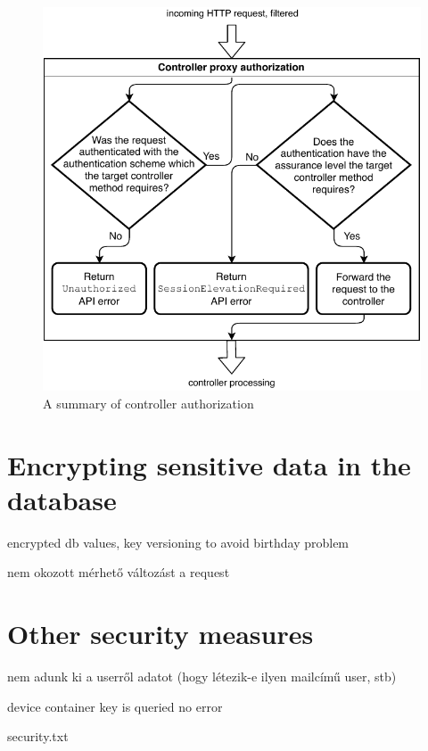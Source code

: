 \begin{figure}[!htb]
    \includegraphics[width=\textwidth]{figures/controller-authorization.pdf}
    \caption{A summary of controller authorization}
    \label{fig:controller-authorization}
\end{figure}

\section{Encrypting sensitive data in the database}

encrypted db values, key versioning to avoid birthday problem

nem okozott mérhető változást a request

\section{Other security measures}

nem adunk ki a userről adatot (hogy létezik-e ilyen mailcímű user, stb)

device container key is queried no error

security.txt
